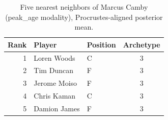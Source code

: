 \begin{table}[htbp]
  \centering\small
  \begin{tabular}{rllc}
    \toprule
    Rank & Player & Position & Archetype \\
    \midrule
    1 & Loren Woods & C & 3 \\
    2 & Tim Duncan & F & 3 \\
    3 & Jerome Moiso & F & 3 \\
    4 & Chris Kaman & C & 3 \\
    5 & Damion James & F & 3 \\
    \bottomrule
  \end{tabular}
  \caption{Five nearest neighbors of Marcus Camby (peak_age modality), Procrustes-aligned posterior mean.}
  \label{tab:Marcus_Camby_neighbors_peak_age}
\end{table}

